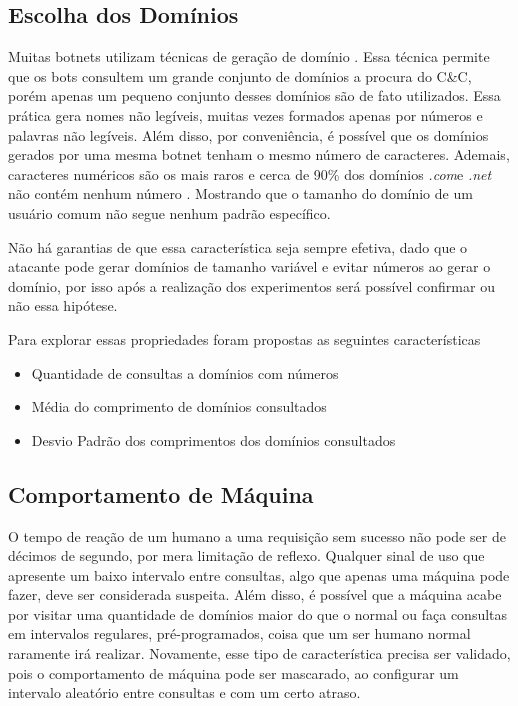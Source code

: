 \subsection{Escolha dos Domínios}
Muitas botnets utilizam técnicas de geração de domínio \citep{zhou2013dga}. Essa técnica permite que os bots consultem um grande conjunto de domínios a procura do C\&C, porém apenas um pequeno conjunto desses domínios são de fato utilizados. Essa prática gera nomes não legíveis, muitas vezes formados apenas por números e palavras não legíveis. Além disso, por conveniência, é possível que os domínios gerados por uma mesma botnet tenham o mesmo número de caracteres. Ademais, caracteres numéricos são os mais raros e cerca de 90\% dos domínios \textit{.com}e \textit{.net} não contém nenhum número \cite{data2016domain}. Mostrando que o tamanho do domínio de um usuário comum não segue nenhum padrão específico.

Não há garantias de que essa característica seja sempre efetiva, dado que o atacante pode gerar domínios de tamanho variável e evitar números ao gerar o domínio, por isso após a realização dos experimentos será possível confirmar ou não essa hipótese.

Para explorar essas propriedades foram propostas as seguintes características 

\begin{itemize}
\item Quantidade de consultas a domínios com números 
\item Média do comprimento de domínios consultados
\item Desvio Padrão dos comprimentos dos domínios consultados
\end{itemize}

\subsection{Comportamento de Máquina}

O tempo de reação de um humano a uma requisição sem sucesso não pode ser de décimos de segundo, por mera limitação de reflexo. Qualquer sinal de uso que apresente um baixo intervalo entre consultas, algo que apenas uma máquina pode fazer, deve ser considerada suspeita. Além disso, é possível que a máquina acabe por visitar uma quantidade de domínios maior do que o normal ou faça consultas em intervalos regulares, pré-programados, coisa que um ser humano normal raramente irá realizar. Novamente, esse tipo de característica precisa ser validado, pois o comportamento de máquina pode ser mascarado, ao configurar um intervalo aleatório entre consultas e com um certo atraso.

